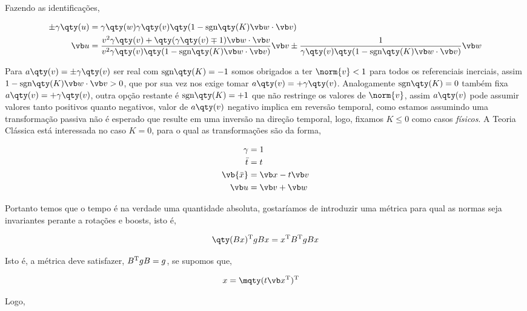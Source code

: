 \documentclass[twoside]{amsart}
\numberwithin{equation}{section}
\newcommand{\sgn}[1]{\mbox{sgn}\qty(#1)}
\begin{document}
\begin{refsection}
Fazendo as identificações,

\begin{align}
    \pm\gamma\qty(u)&=\gamma\qty(w)\gamma\qty(v)\qty(1-\sgn K\vb w\cdot \vb v)\\
    \vb u &=\frac{v^2\gamma\qty(v)+\qty(\gamma\qty(v)\mp1)\vb w\cdot\vb v}{v^2\gamma\qty(v)\qty(1-\sgn K\vb w\cdot\vb v)}\vb v\pm\frac{1}{\gamma\qty(v)\qty(1-\sgn K \vb w\cdot \vb v)}\vb w
\end{align}

Para $a\qty(v)=\pm\gamma\qty(v)$ ser real com $\sgn K=-1$ somos obrigados a ter $\norm{v}< 1$ para todos os referenciais inerciais, assim $1-\sgn K \vb w\cdot \vb v>0$, que por sua vez nos exige tomar $a\qty(v)=+\gamma\qty(v)$. Analogamente $\sgn K=0$ também fixa $a\qty(v)=+\gamma\qty(v)$, outra opção restante é $\sgn K=+1$ que não restringe os valores de $\norm{v}$, assim $a\qty(v)$ pode assumir valores tanto positivos quanto negativos, valor de $a\qty(v)$ negativo implica em reversão temporal, como estamos assumindo uma transformação passiva não é esperado que resulte em uma inversão na direção temporal, logo, fixamos $K\leq 0$ como casos \emph{físicos}. A Teoria Clássica está interessada no caso $K=0$, para o qual as transformações são da forma,

\begin{align}
    \gamma&=1\\
    {\bar t}&=t\\
    \vb {\bar x}&=\vb x- t\vb v\\
    \vb u&=\vb v+\vb w
\end{align}

Portanto temos que o tempo é na verdade uma quantidade absoluta, gostaríamos de introduzir uma métrica para qual as normas seja invariantes perante a rotações e boosts, isto é,

\begin{align*}
    \qty(Bx)^{\textup T}gBx=x^{\textup T}B^\textup{T}gBx
\end{align*}

Isto é, a métrica deve satisfazer, $B^{\textup T}gB=g$, se supomos que,

\begin{align*}
    x=\mqty(t&\vb x^{\textup T})^{\textup T}
\end{align*}    

Logo,


\end{refsection}
\end{document}
